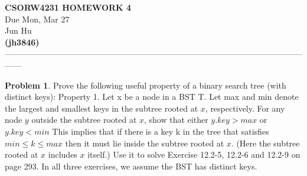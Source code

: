 \documentclass[11pt]{article}
\theoremstyle{definition}
\newtheorem{problem}{Problem}
\begin{document}
\begin{center}
\Large{} 
\textbf{CSORW4231 HOMEWORK 4} \\
\normalsize{}
Due Mon, Mar 27 \\
\large{Jun Hu \\
\textbf{(jh3846)}} \\ 
------------------------------------------------------------------------------------------------------------------
\end{center}

\begin{problem}
\large{Prove the following useful property of a binary search tree (with distinct keys):
Property 1. Let x be a node in a BST T. Let max and min denote the largest and smallest keys
in the subtree rooted at $x$, respectively. For any node $y$ outside the subtree rooted at $x$, show that either $y.key > max$ or $y.key < min$
This implies that if there is a key k in the tree that satisfies $min ≤ k ≤ max$
then it must lie inside the subtree rooted at $x$. (Here the subtree rooted at $x$ includes $x$ itself.) Use it to solve Exercise 12.2-5, 12.2-6 and 12.2-9 on page 293. In all three exercises, we assume
the BST has distinct keys.}
\end{problem}
\end{document}
